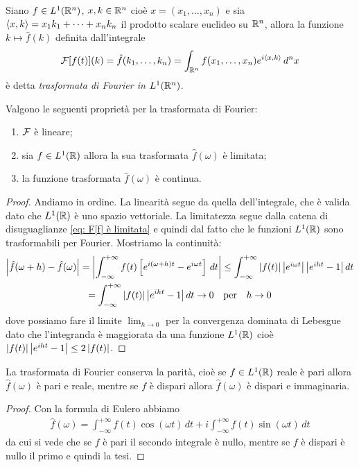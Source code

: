 \begin{definition}[ Trasformata in $ L^1(\R^n) $ ]
  Siano $ f \in L^1(\R^n) $, $ x, k \in \R^n $ cioè $ x = (x_1, \dots, x_n) $ e sia $ \sc{x,k} = x_1k_1 + \dots + x_n k_n $ il prodotto scalare euclideo 
  su $ \R^n $, allora la funzione $ k \mapsto \hat{f}(k) $ definita dall'integrale 
  \begin{align}
    \F[f(t)](k) = \hat{f}(k_1, \dots, k_n) = \int_{\R^n} f(x_1, \dots, x_n) e^{i \sc{x,k}} \,d^nx
  \end{align}
  è detta \textit{trasformata di Fourier in $ L^1(\R^n) $}.
\end{definition}
\begin{lemma} 
  Valgono le seguenti proprietà per la trasformata di Fourier:
  \begin{enumerate}
    \item $ \F $ è lineare;
    \item sia $ f \in L^1(\R) $ allora la sua trasformata $ \hat{f}(\omega) $ è limitata;
    \item la funzione trasformata $ \hat{f}(\omega) $ è continua.
  \end{enumerate}
\end{lemma}
\begin{proof}
  Andiamo in ordine. La linearità segue da quella dell'integrale, che è valida dato che $ L^1(\R) $ è uno spazio vettoriale.
  La limitatezza segue dalla catena di disuguaglianze \eqref{eq: F[f] è limitata} e quindi dal fatto che le funzioni $ L^1(\R) $ sono trasformabili per 
  Fourier. Mostriamo la continuità: 
  \begin{gather}
    \abs{\hat{f}(\omega + h) - \hat{f}(\omega)} = \abs{\int_{-\infty}^{+\infty} f(t) \left[ e^{i(\omega + h)t} - e^{i\omega t}\right]\,dt} 
    \leq \int_{-\infty}^{+\infty} \abs{f(t)}{\TS \abs{e^{i\omega t}} \abs{ e^{iht} - 1} }\,dt
    \\
    = \int_{-\infty}^{+\infty} \abs{f(t)} {\abs{ e^{iht} - 1} }\,dt \to 0 \quad \textnormal{per} \quad h \to 0
  \end{gather}
  dove possiamo fare il limite $ \lim_{h \to 0} $ per la convergenza dominata di Lebesgue dato che l'integranda è maggiorata da una funzione $ L^1(\R) $ 
  cioè $ \abs{f(t)} {\abs{ e^{iht} - 1} } \leq 2 \abs{f(t)} $.
\end{proof}

\begin{lemma}[  ]
  La trasformata di Fourier conserva la parità, cioè se $ f \in L^1(\R) $ reale è pari allora $ \hat{f}(\omega) $ è pari e reale, mentre se $ f $ è 
  dispari allora $ \hat{f}(\omega) $ è dispari e immaginaria.
\end{lemma}
\begin{proof}
  Con la formula di Eulero abbiamo 
  \begin{align}
    \hat{f}(\omega) = \int_{-\infty}^{+\infty} f(t) \cos({\omega t}) \,dt + i \int_{-\infty}^{+\infty} f(t) \sin({\omega t}) \,dt
  \end{align}
  da cui si vede che se $ f $ è pari il secondo integrale è nullo, mentre se $ f $ è dispari è nullo il primo e quindi la tesi.
\end{proof}

